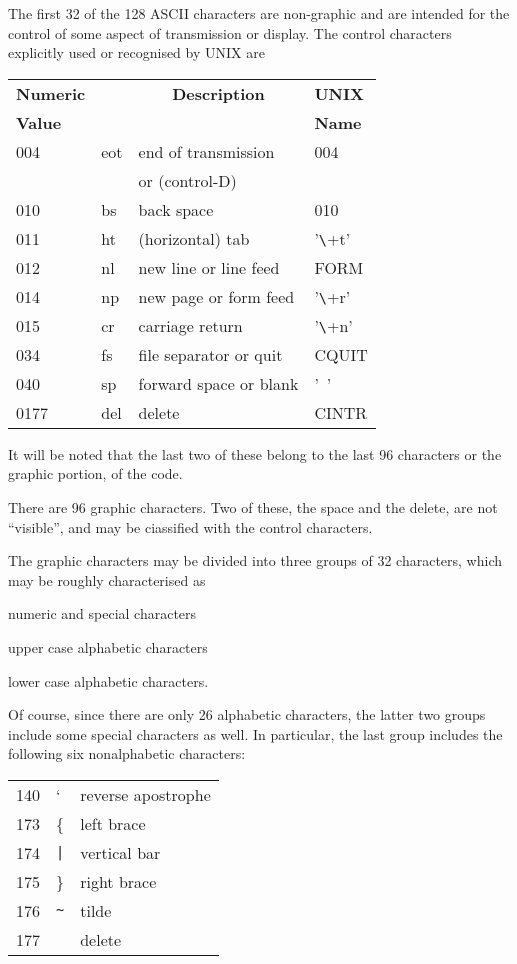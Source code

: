 The first 32 of the 128 ASCII characters are non-graphic and are intended
for the control of some aspect of
transmission or display. The control
characters explicitly used or recognised by UNIX are

\noindent\begin{tabular}{llll}\\
{\bf Numeric} & & \multicolumn{1}{c}{\bf Description} & {\bf UNIX} \\
{\bf Value} &	&	& {\bf Name} \\ \hline
004 & eot & end of transmission		& 004 \\
    &    & or (control-D) & \\
010 & bs & back space			& 010 \\
011 & ht & (horizontal) tab		& '\verb+\+t' \\
012 & nl & new line or line feed	& FORM \\
014 & np & new page or form feed	& '\verb+\+r' \\
015 & cr & carriage return		& '\verb+\+n' \\
034 & fs & file separator or quit	& CQUIT \\
040 & sp & forward space or blank	& '~' \\
0177 & del & delete			& CINTR
\end{tabular}


It will be noted that the last two of
these belong to the last 96 characters
or the graphic portion, of the code.


There are 96 graphic characters. Two of
these, the space and the delete, are
not ``visible'', and may be ciassified
with the control characters.

The graphic characters may be divided
into three groups of 32 characters,
which may be roughly characterised as

\bi
\item numeric and special characters
\item upper case alphabetic characters
\item lower case alphabetic characters.
\ei

Of course, since there are only 26
alphabetic characters, the latter two
groups include some special characters
as well. In particular, the last group
includes the following six nonalphabetic characters:

\begin{tabular}{lll}\\
140 & `			& reverse apostrophe \\
173 & \{		& left brace \\
174 & \verb+|+		& vertical bar \\
175 & \}		& right brace \\
176 & \verb+~+		& tilde \\
177 &			& delete \\
\end{tabular}

